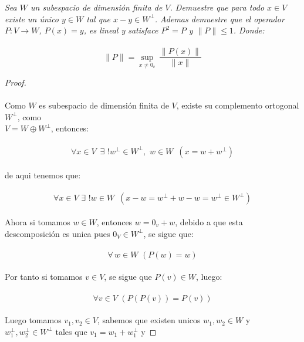 \documentclass[11pt,letterpaper]{article}
\begin{document}
\begin{tcolorbox}[
	title = \textcolor{black}{\textcolor{white}{Problema 9}},]
\textit{Sea $W$ un subespacio de dimensi\'on finita de $V$. Demuestre que para todo $x\in V$ existe un \'unico $y\in W$ tal que $x-y\in W^{\bot}$. Ademas demuestre 
que el operador $P:V\rightarrow W$, $P(x)=y$, es lineal y satisface $P^2=P$ y $\|P\|\leq 1$. Donde:\,\\
\,\\
\begin{equation*}
	\|P\|=\sup_{x\neq 0_v}\,\frac{\|P(x)\|}{\|x\|} 
\end{equation*} 
}
\end{tcolorbox}
\begin{proof}\,\\
	\,\\
	Como $W$ es subespacio de dimensi\'on finita de $V$, existe su complemento ortogonal $W^{\perp}$, como\\ $V=W\oplus W^{\perp}$, entonces:\,\\
	\,\\
	\begin{equation*}
		\forall x\in V\,\,\,\exists\,\,!w^{\perp}\in W^{\perp},\,\,w\in W\,\,\,(x=w+w^{\perp})
	\end{equation*}\,\\
	de aqui tenemos que:\,\\
	\,\\
	\begin{equation*}
		\forall x\in V\,\,\exists\,\,!w\in W\,\,\,(x-w=w^{\perp}+w-w=w^{\perp}\in W^{\perp})
	\end{equation*}\,\\
	Ahora si tomamos $w\in W$, entonces $w=0_{v}+w$, debido a que esta descomposici\'on es unica pues $0_V\in W^{\perp}$, se sigue que:\,\\
	\,\\
	\begin{equation*}
		\forall\,w\in W\,\,(P(w)=w)
	\end{equation*}\,\\
	Por tanto si tomamos $v\in V$, se sigue que $P(v)\in W$, luego:\,\\
	\,\\
	\begin{equation*}
		\forall v\in V\,\,(P(P(v))=P(v))
	\end{equation*}\,\\
	Luego tomamos $v_1,v_2\in V$, sabemos que existen unicos $w_1,w_2\in W$ y $w_1^{\perp},w_2^{\perp}\in W^{\perp}$ tales que $v_1=w_1+w_1^{\perp}$ y 

\end{proof}
\end{document}

